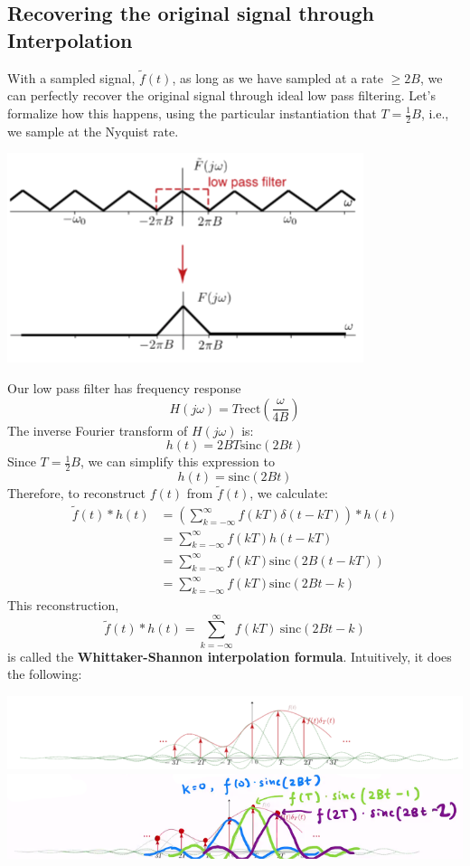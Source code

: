 \documentclass[10pt]{article}
\newcommand{\sinc}{\text{sinc}}
\newcommand{\rect}{\text{rect}}
\begin{document}
\subsection*{Recovering the original signal through Interpolation}
With a sampled signal, $\tilde{f}(t)$, as long as we have sampled at a rate $\geq 2B$, we can perfectly recover the original signal through ideal low pass filtering.  Let's formalize how this happens, using the particular instantiation that $T = \frac{1}{2}B$, i.e., we sample at the Nyquist rate.
\begin{center}
    \includegraphics*[scale=0.8]{W8_14.png}
\end{center}
Our low pass filter has frequency response
\[H(j\omega) = T\rect\left(\frac{\omega}{4B}\right)\]
The inverse Fourier transform of $H(j\omega)$ is:
\[h(t) = 2BT\sinc(2Bt)\]
Since $T = \frac{1}{2}B$, we can simplify this expression to 
\[h(t) = \sinc(2Bt)\]
Therefore, to reconstruct $f(t)$ from $\tilde{f}(t)$, we calculate:
\begin{align*}
    \tilde{f}(t) * h(t) &= \left(\sum_{k=-\infty}^\infty f(kT) \delta(t - kT)\right) * h(t)\\
    &= \sum_{k=-\infty}^\infty f(kT) h(t - kT)\\
    &= \sum_{k=-\infty}^\infty f(kT) \sinc(2B(t-kT))\\
    &= \sum_{k=-\infty}^\infty f(kT) \sinc(2Bt - k)
\end{align*}
This reconstruction,
\[\boxed{\tilde{f}(t) * h(t) = \sum_{k=-\infty}^\infty f(kT) \:\sinc(2Bt - k)}\]
is called the \textbf{Whittaker-Shannon interpolation formula}.  Intuitively, it does the following:
\begin{center}
    \includegraphics*[width=\textwidth]{W8_15.png}
    \includegraphics*[width=\textwidth]{W8_16.png}
\end{center}
\end{document}
